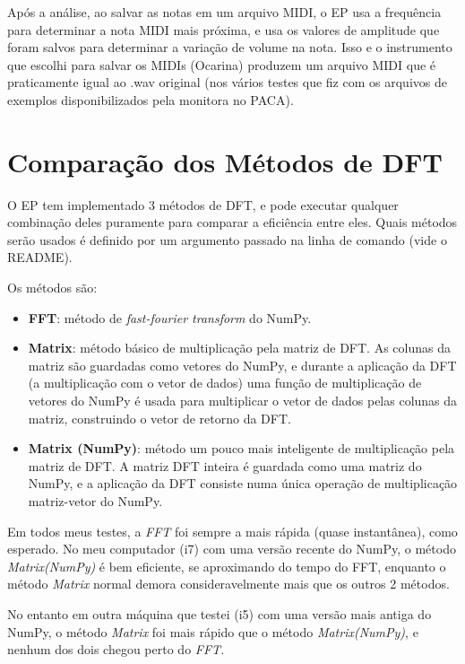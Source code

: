 \documentclass[a4paper,11pt]{article}
\begin{document}
Após a análise, ao salvar as notas em um arquivo MIDI, o EP usa a frequência para determinar a nota MIDI mais próxima, e usa
os valores de amplitude que foram salvos para determinar a variação de volume na nota. Isso e o instrumento que escolhi para
salvar os MIDIs (Ocarina) produzem um arquivo MIDI que é praticamente igual ao .wav original (nos vários testes que fiz com 
os arquivos de exemplos disponibilizados pela monitora no PACA).

\section{Comparação dos Métodos de DFT}

O EP tem implementado 3 métodos de DFT, e pode executar qualquer combinação deles puramente para comparar a eficiência entre
eles. Quais métodos serão usados é definido por um argumento passado na linha de comando (vide o README).

Os métodos são:
\begin{itemize}
  \item \textbf{FFT}: método de \textit{fast-fourier transform} do NumPy.
  \item \textbf{Matrix}: método básico de multiplicação pela matriz de DFT. As colunas da matriz são guardadas como vetores do
  NumPy, e durante a aplicação da DFT (a multiplicação com o vetor de dados) uma função de multiplicação de vetores do NumPy é 
  usada para multiplicar o vetor de dados pelas colunas da matriz, construindo o vetor de retorno da DFT.
  \item \textbf{Matrix (NumPy)}: método um pouco mais inteligente de multiplicação pela matriz de DFT. A matriz DFT inteira é
  guardada como uma matriz do NumPy, e a aplicação da DFT consiste numa única operação de multiplicação matriz-vetor do NumPy.
\end{itemize}

Em todos meus testes, a \textit{FFT} foi sempre a mais rápida (quase instantânea), como esperado. No meu computador (i7) com uma versão
recente do NumPy, o método \textit{Matrix(NumPy)} é bem eficiente, se aproximando do tempo do FFT, enquanto o método \textit{Matrix}
normal demora consideravelmente mais que os outros 2 métodos.

No entanto em outra máquina que testei (i5) com uma versão mais antiga do NumPy, o método \textit{Matrix} foi mais rápido que o
método \textit{Matrix(NumPy)}, e nenhum dos dois chegou perto do \textit{FFT}.
\end{document}
